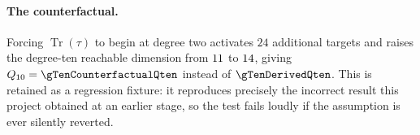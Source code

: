 \paragraph{The counterfactual.}
Forcing $\operatorname{Tr}(\tau)$ to begin at degree two activates
$24$ additional targets and raises the degree-ten reachable dimension from
$11$ to $14$, giving $\Qten = \gTenCounterfactualQten$ instead of
$\gTenDerivedQten$. This is retained as a regression fixture: it reproduces
precisely the incorrect result this project obtained at an earlier stage, so the
test fails loudly if the assumption is ever silently reverted.
